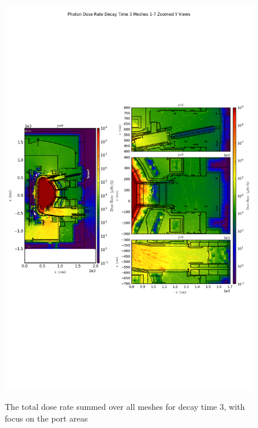 \documentclass[12pt]{article}
\begin{document}
\begin{figure}[ht!]
\centering
\includegraphics[trim={0cm 9cm 0cm 10cm},clip,scale=0.75]{../plots/final_model_nob4c/Photon_Dose_Rate_Decay_Time_3_Meshes_1-7_Zoomed_Y_Views.png}
\label{fig:photons_dc3_no4bc_total_zoomed}
\caption{The total dose rate summed over all meshes for decay time 3, with focus on the port areas}
\end{figure}
\end{document}

